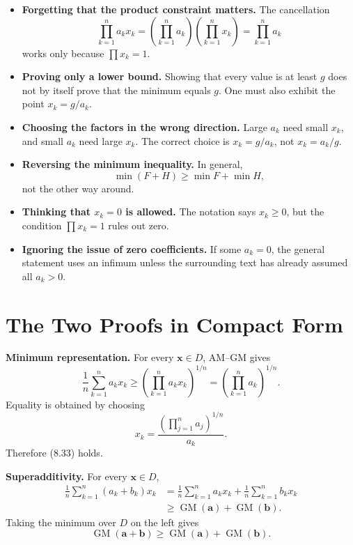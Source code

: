 \documentclass[11pt]{article}
\newcommand{\GM}{\operatorname{GM}}
\begin{document}
\begin{itemize}
\item \textbf{Forgetting that the product constraint matters.}
The cancellation
\[
 \prod_{k=1}^{n}a_kx_k
 =\left(\prod_{k=1}^{n}a_k\right)
  \left(\prod_{k=1}^{n}x_k\right)
 =\prod_{k=1}^{n}a_k
\]
works only because $\prod x_k=1$.

\item \textbf{Proving only a lower bound.}
Showing that every value is at least $g$ does not by itself prove that the
minimum equals $g$.  One must also exhibit the point $x_k=g/a_k$.

\item \textbf{Choosing the factors in the wrong direction.}
Large $a_k$ need small $x_k$, and small $a_k$ need large $x_k$.  The correct
choice is $x_k=g/a_k$, not $x_k=a_k/g$.

\item \textbf{Reversing the minimum inequality.}
In general,
\[
 \min(F+H)\ge\min F+\min H,
\]
not the other way around.

\item \textbf{Thinking that $x_k=0$ is allowed.}
The notation says $x_k\ge0$, but the condition $\prod x_k=1$ rules out zero.

\item \textbf{Ignoring the issue of zero coefficients.}
If some $a_k=0$, the general statement uses an infimum unless the surrounding
text has already assumed all $a_k>0$.
\end{itemize}

\section{The Two Proofs in Compact Form}

\textbf{Minimum representation.}
For every $\mathbf x\in D$, AM--GM gives
\[
 \frac1n\sum_{k=1}^{n}a_kx_k
 \ge
 \left(\prod_{k=1}^{n}a_kx_k\right)^{1/n}
 =
 \left(\prod_{k=1}^{n}a_k\right)^{1/n}.
\]
Equality is obtained by choosing
\[
 x_k=\frac{(\prod_{j=1}^{n}a_j)^{1/n}}{a_k}.
\]
Therefore (8.33) holds.

\textbf{Superadditivity.}
For every $\mathbf x\in D$,
\begin{align*}
 \frac1n\sum_{k=1}^{n}(a_k+b_k)x_k
 &=\frac1n\sum_{k=1}^{n}a_kx_k
   +\frac1n\sum_{k=1}^{n}b_kx_k\\
 &\ge\GM(\mathbf a)+\GM(\mathbf b).
\end{align*}
Taking the minimum over $D$ on the left gives
\[
 \GM(\mathbf a+\mathbf b)
 \ge\GM(\mathbf a)+\GM(\mathbf b).
\]
\end{document}
